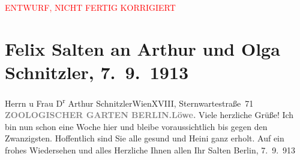
\begin{center}
            \textcolor{red}{ENTWURF, NICHT FERTIG KORRIGIERT}
                      \end{center}
            
         
         \renewcommand{\erwaehntePersonen}{Personen: Olga Schnitzler, Heinrich Schnitzler}
         \renewcommand{\erwaehnteOrte}{Orte: Berlin, Charlottenburg, Sternwartestraße, Wien, Zoologischer Garten Berlin}
         \renewcommand{\erwaehnteWerke}{}
               \section[Felix Salten an Arthur und Olga Schnitzler, 7. 9. 1913]{ Felix Salten an Arthur und Olga Schnitzler,
               7. 9. 1913}\nopagebreak{}\rehead{ }\begin{ledgroupsized}[t]{13cm}\normalsize\beginnumbering \toendnotes[C]{\smallbreak\pagebreak[2]} 
\pstart{}{\pb}Herrn u Frau D\textsuperscript{r} Arthur Schnitzler\pend{}\pstart{}Wien\pend{}\pstart{}XVIII, Sternwartestraße 71\pend{}{\bigskip}\pstart
           \noindent{}{\pb}\textcolor{gray}{\textbf{ZOOLOGISCHER GARTEN
                              BERLIN.}}\hfill \textcolor{gray}{\textbf{Löwe.}}\pend
           \pstart
           {\pb}Viele herzliche Grüße! \pend
           \pstart
           Ich bin nun schon eine Woche hier und bleibe voraussichtlich bis gegen den
               Zwanzigsten. Hoffentlich sind Sie alle gesund und Heini ganz erholt. Auf ein frohes Wiedersehen und alles Herzliche Ihnen
               allen\pend
           \pstart Ihr \spacefill\mbox{Salten}\pend{}\pstart
           Berlin, 7. 9. 913\pend
           
         
         \endnumbering{}\end{ledgroupsized}\begin{anhang}\end{anhang}\newcommand{\dateiname}{L03562}\newcommand{\titel}{Felix Salten an Arthur und Olga Schnitzler, 7. 9. 1913}\newcommand{\editorInnen}{Martin Anton Müller und Laura Untner}
      